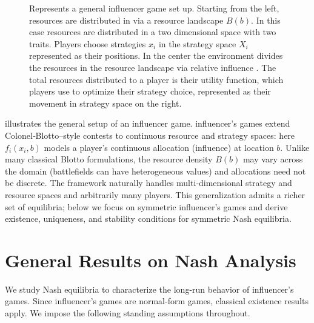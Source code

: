 \documentclass{article}
\begin{document}
                \begin{figure}[ht!]
                    
                    \caption{ Represents a general influencer game set up. Starting from the left, resources are distributed in via a resource landscape $B(b)$. In this case resources are distributed in a two dimensional space with two traits. Players choose strategies $x_i$ in the strategy space $X_i$ represented as their positions. In the center the environment divides the resources in the resource landscape via relative influence . The total resources distributed to a player is their utility function, which players use to optimize their strategy choice, represented as their movement in strategy space on the right.}
                    \label{fig:game_setup_demo}
                \end{figure}


                 illustrates the general setup of an influencer game. influencer's games extend Colonel‑Blotto–style contests to continuous resource and strategy spaces: here $f_i(x_i,b)$ models a player's continuous allocation (influence) at location $b$. Unlike many classical Blotto formulations, the resource density $B(b)$ may vary across the domain (battlefields can have heterogeneous values) and allocations need not be discrete. The framework naturally handles multi‑dimensional strategy and resource spaces and arbitrarily many players. This generalization admits a richer set of equilibria; below we focus on symmetric influencer's games and derive existence, uniqueness, and stability conditions for symmetric Nash equilibria.

        
        
    \section{General Results on Nash Analysis}

       We study Nash equilibria to characterize the long-run behavior of influencer's games. Since influencer's games are normal-form games, classical existence results apply. We impose the following standing assumptions throughout.
\end{document}
